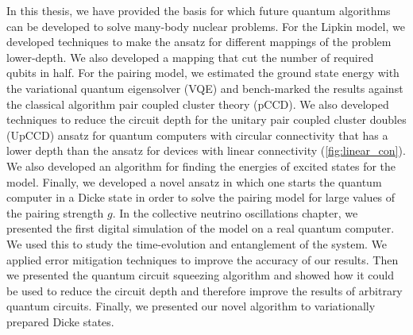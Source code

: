 \documentclass[Dual]{msu-thesis}
\begin{document}
In this thesis, we have provided the basis for which future quantum algorithms can be developed to solve many-body nuclear problems. For the Lipkin model, we developed techniques to make the ansatz for different mappings of the problem lower-depth. We also developed a mapping that cut the number of required qubits in half. For the pairing model, we estimated the ground state energy with the variational quantum eigensolver (VQE) and bench-marked the results against the classical algorithm pair coupled cluster theory (pCCD). We also developed techniques to reduce the circuit depth for the unitary pair coupled cluster doubles (UpCCD) ansatz for quantum computers with circular connectivity that has a lower depth than the ansatz for devices with linear connectivity (\ref{fig:linear_con}). We also developed an algorithm for finding the energies of excited states for the model. Finally, we developed a novel ansatz in which one starts the quantum computer in a Dicke state in order to solve the pairing model for large values of the pairing strength $g$. In the collective neutrino oscillations chapter, we presented the first digital simulation of the model on a real quantum computer. We used this to study the time-evolution and entanglement of the system. We applied error mitigation techniques to improve the accuracy of our results. Then we presented the quantum circuit squeezing algorithm and showed how it could be used to reduce the circuit depth and therefore improve the results of arbitrary quantum circuits. Finally, we presented our novel algorithm to variationally prepared Dicke states.
\end{document}
